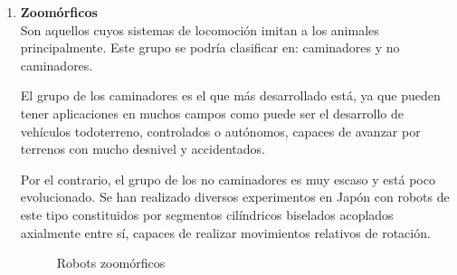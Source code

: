 \begin{enumerate}
\item \textbf{Zoomórficos}\\ Son aquellos cuyos sistemas de locomoción imitan a los animales principalmente. Este grupo se podría clasificar en: caminadores y no caminadores.

El grupo de los caminadores es el que más desarrollado está, ya que pueden tener aplicaciones en muchos campos como puede ser el desarrollo de vehículos todoterreno, controlados o autónomos, capaces de avanzar por terrenos con mucho desnivel y accidentados.

Por el contrario, el grupo de los no caminadores es muy escaso y está poco evolucionado. Se han realizado diversos experimentos en Japón con robots de este tipo constituidos por segmentos cilíndricos biselados acoplados axialmente entre sí, capaces de realizar movimientos relativos de rotación.

\begin{figure}[H]
\centering
{}
\quad
{}
\caption{Robots zoomórficos}
\label{figura24}
\end{figure} 


\end{enumerate}
